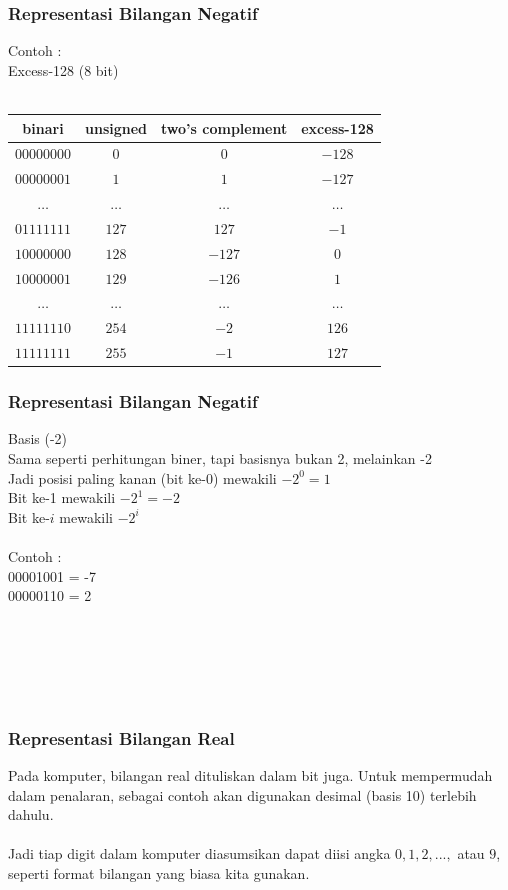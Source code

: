 \documentclass{beamer}
\begin{document}
\begin{frame}
\frametitle{Representasi Bilangan Negatif}
Contoh :
\\Excess-128 (8 bit)
\\\ \\\begin{tabular}{|c|c|c|c|}
    \hline
	binari & unsigned & two's complement & excess-128\\
	\hline
	$00000000$ & $0$ & $0$ & $-128$\\
	$00000001$ & $1$ & $1$ & $-127$\\
	$\dots$ & $\dots$ & $\dots$ & $\dots$\\
	$01111111$ & $127$ & $127$ & $-1$\\ 
	$10000000$ & $128$ & $-127$ & $0$\\ 
	$10000001$ & $129$ & $-126$ & $1$\\ 
	$\dots$ & $\dots$ & $\dots$ & $\dots$\\
	$11111110$ & $254$ & $-2$ & $126$\\ 
	$11111111$ & $255$ & $-1$ & $127$\\
	\hline 
\end{tabular}

\end{frame}


\begin{frame}
\frametitle{Representasi Bilangan Negatif}
Basis (-2)
\\Sama seperti perhitungan biner, tapi basisnya bukan 2, melainkan -2
\\Jadi posisi paling kanan (bit ke-0) mewakili $-2^0 = 1$
\\Bit ke-1 mewakili $-2^1 = -2$
\\Bit ke-$i$ mewakili $-2^i$
\\\ \\
Contoh :
\\00001001 = -7
\\00000110 = 2
\\\ \\\ \\\ \\\ \\\
\end{frame}


\begin{frame}
\frametitle{Representasi Bilangan Real}
Pada komputer, bilangan real dituliskan dalam bit juga. Untuk mempermudah dalam penalaran, sebagai contoh akan digunakan desimal (basis 10) terlebih dahulu.
\\\ \\Jadi tiap digit dalam komputer diasumsikan dapat diisi angka $0,1,2,...,$ atau $9$, seperti format bilangan yang biasa kita gunakan.
\end{frame}
\end{document}
